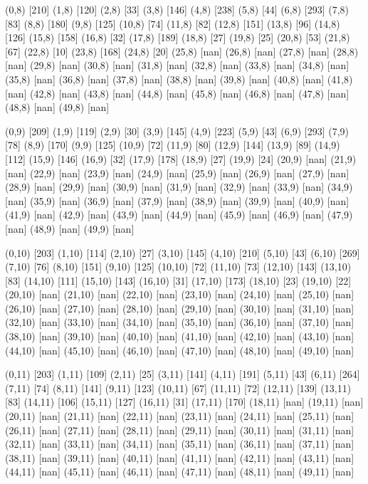 {(0,8) [210] (1,8) [120] (2,8) [33] (3,8) [146] (4,8) [238] (5,8) [44] (6,8) [293] (7,8) [83] (8,8) [180] (9,8) [125] (10,8) [74] (11,8) [82] (12,8) [151] (13,8) [96] (14,8) [126] (15,8) [158] (16,8) [32] (17,8) [189] (18,8) [27] (19,8) [25] (20,8) [53] (21,8) [67] (22,8) [10] (23,8) [168] (24,8) [20] (25,8) [nan] (26,8) [nan] (27,8) [nan] (28,8) [nan] (29,8) [nan] (30,8) [nan] (31,8) [nan] (32,8) [nan] (33,8) [nan] (34,8) [nan] (35,8) [nan] (36,8) [nan] (37,8) [nan] (38,8) [nan] (39,8) [nan] (40,8) [nan] (41,8) [nan] (42,8) [nan] (43,8) [nan] (44,8) [nan] (45,8) [nan] (46,8) [nan] (47,8) [nan] (48,8) [nan] (49,8) [nan] 

(0,9) [209] (1,9) [119] (2,9) [30] (3,9) [145] (4,9) [223] (5,9) [43] (6,9) [293] (7,9) [78] (8,9) [170] (9,9) [125] (10,9) [72] (11,9) [80] (12,9) [144] (13,9) [89] (14,9) [112] (15,9) [146] (16,9) [32] (17,9) [178] (18,9) [27] (19,9) [24] (20,9) [nan] (21,9) [nan] (22,9) [nan] (23,9) [nan] (24,9) [nan] (25,9) [nan] (26,9) [nan] (27,9) [nan] (28,9) [nan] (29,9) [nan] (30,9) [nan] (31,9) [nan] (32,9) [nan] (33,9) [nan] (34,9) [nan] (35,9) [nan] (36,9) [nan] (37,9) [nan] (38,9) [nan] (39,9) [nan] (40,9) [nan] (41,9) [nan] (42,9) [nan] (43,9) [nan] (44,9) [nan] (45,9) [nan] (46,9) [nan] (47,9) [nan] (48,9) [nan] (49,9) [nan] 

(0,10) [203] (1,10) [114] (2,10) [27] (3,10) [145] (4,10) [210] (5,10) [43] (6,10) [269] (7,10) [76] (8,10) [151] (9,10) [125] (10,10) [72] (11,10) [73] (12,10) [143] (13,10) [83] (14,10) [111] (15,10) [143] (16,10) [31] (17,10) [173] (18,10) [23] (19,10) [22] (20,10) [nan] (21,10) [nan] (22,10) [nan] (23,10) [nan] (24,10) [nan] (25,10) [nan] (26,10) [nan] (27,10) [nan] (28,10) [nan] (29,10) [nan] (30,10) [nan] (31,10) [nan] (32,10) [nan] (33,10) [nan] (34,10) [nan] (35,10) [nan] (36,10) [nan] (37,10) [nan] (38,10) [nan] (39,10) [nan] (40,10) [nan] (41,10) [nan] (42,10) [nan] (43,10) [nan] (44,10) [nan] (45,10) [nan] (46,10) [nan] (47,10) [nan] (48,10) [nan] (49,10) [nan] 

(0,11) [203] (1,11) [109] (2,11) [25] (3,11) [141] (4,11) [191] (5,11) [43] (6,11) [264] (7,11) [74] (8,11) [141] (9,11) [123] (10,11) [67] (11,11) [72] (12,11) [139] (13,11) [83] (14,11) [106] (15,11) [127] (16,11) [31] (17,11) [170] (18,11) [nan] (19,11) [nan] (20,11) [nan] (21,11) [nan] (22,11) [nan] (23,11) [nan] (24,11) [nan] (25,11) [nan] (26,11) [nan] (27,11) [nan] (28,11) [nan] (29,11) [nan] (30,11) [nan] (31,11) [nan] (32,11) [nan] (33,11) [nan] (34,11) [nan] (35,11) [nan] (36,11) [nan] (37,11) [nan] (38,11) [nan] (39,11) [nan] (40,11) [nan] (41,11) [nan] (42,11) [nan] (43,11) [nan] (44,11) [nan] (45,11) [nan] (46,11) [nan] (47,11) [nan] (48,11) [nan] (49,11) [nan] 

}
